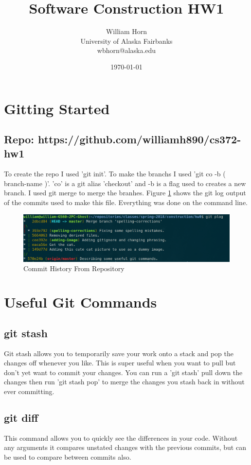 \documentclass{article}
\begin{document}
\title{Software Construction HW1}
\author{William Horn\\University of Alaska Fairbanks\\wbhorn@alaska.edu}
\date{\today}
\maketitle

\section{Gitting Started}
\subsection{Repo: https://github.com/williamh890/cs372-hw1 }

To create the repo I used 'git init'. To make the branchs I used 'git co -b ( branch-name )'.
'co' is a git alias 'checkout' and -b is a flag used to creates a new branch.
I used git merge to merge the branhes.  Figure \ref{fig:hist} shows the git log
output of the commits used to make this file. Everything was done on the command line.

\begin{figure}[h!]
  \includegraphics[width=\linewidth]{hw1-commit-history.png}
  \caption{Commit History From Repository}
  \label{fig:hist}
\end{figure}

\section{Useful Git Commands}
\subsection{git stash}
Git stash allows you to temporarily save your work onto a stack and pop the changes off whenever you like.
This is super useful when you want to pull but don't yet want to commit your changes. You can run a 'git stash' pull
down the changes then run 'git stash pop' to merge the changes you stash back in without ever committing.
\subsection{git diff}
This command allows you to quickly see the differences in your code. Without any arguments it compares unstated changes
with the previous commits, but can be used to compare between commits also.
\end{document}
